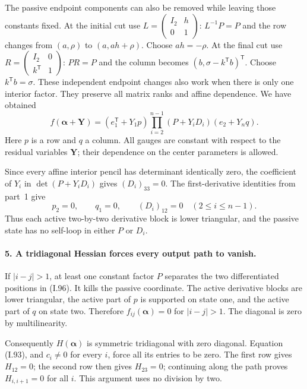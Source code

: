 The passive endpoint components can also be removed while
leaving those constants fixed. At the initial cut use
$L=\left(\begin{smallmatrix}I_2&h\\0&1\end{smallmatrix}\right)$:
$L^{-1}P=P$ and the row changes from $(a,\rho)$ to
$(a,ah+\rho)$. Choose $ah=-\rho$. At the final cut use
$R=\left(\begin{smallmatrix}I_2&0\\k^{\mathsf T}&1\end{smallmatrix}\right)$:
$PR=P$ and the column becomes
$(b,\sigma-k^{\mathsf T}b)^{\mathsf T}$. Choose
$k^{\mathsf T}b=\sigma$. These independent endpoint changes
also work when there is only one interior factor. They preserve
all matrix ranks and affine dependence. We have obtained
\[
 f(\boldsymbol\alpha+\mathbf Y)
 =(e_1^{\mathsf T}+Y_1p)
   \prod_{i=2}^{n-1}(P+Y_iD_i)
   (e_2+Y_nq).
 \tag{I.96}
\]
Here $p$ is a row and $q$ a column. All gauges are constant with
respect to the residual variables $\mathbf Y$; their dependence
on the center parameters is allowed.

Since every affine interior pencil has determinant identically
zero, the coefficient of $Y_i$ in
$\det(P+Y_iD_i)$ gives $(D_i)_{33}=0$. The first-derivative
identities from part~1 give
\[
 p_2=0,\qquad q_1=0,\qquad (D_i)_{12}=0
 \quad(2\le i\le n-1).
 \tag{I.97}
\]
Thus each active two-by-two derivative block is lower triangular,
and the passive state has no self-loop in either $P$ or $D_i$.

\paragraph{5. A tridiagonal Hessian forces every output path to vanish.}
If $|i-j|>1$, at least one constant factor $P$ separates the
two differentiated positions in (I.96). It kills the passive
coordinate. The active derivative blocks are lower triangular,
the active part of $p$ is supported on state one, and the active
part of $q$ on state two. Therefore $f_{ij}(\boldsymbol\alpha)=0$
for $|i-j|>1$. The diagonal is zero by multilinearity.

Consequently $H(\boldsymbol\alpha)$ is symmetric tridiagonal
with zero diagonal. Equation (I.93), and $c_i\ne0$ for every
$i$, force all its entries to be zero. The first row gives
$H_{12}=0$; the second row then gives $H_{23}=0$; continuing
along the path proves $H_{i,i+1}=0$ for all $i$. This argument
uses no division by two.

